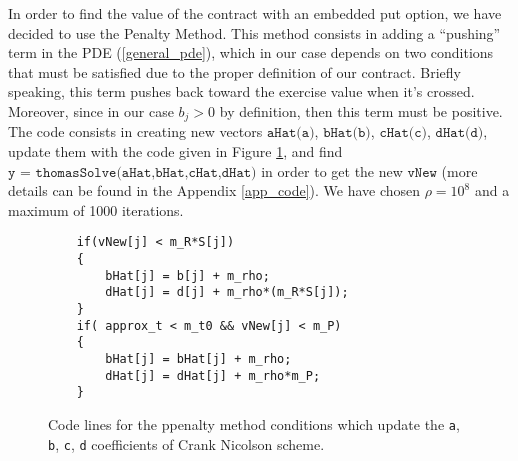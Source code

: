 In order to find the value of the contract with an embedded put option, we have decided to use the Penalty Method. This method consists in adding a ``pushing'' term in the PDE (\ref{general_pde}), which in our case depends on two conditions that must be satisfied due to the proper definition of our contract. Briefly speaking, this term pushes back toward the exercise value when it's crossed. Moreover, since in our case $b_j > 0$ by definition, then this term must be positive. The code consists in creating new vectors $\texttt{aHat(a)}$, $\texttt{bHat(b)}$, $\texttt{cHat(c)}$, $\texttt{dHat(d)}$, update them with the code given in Figure \ref{codePenalty}, and find $\texttt{y = thomasSolve(aHat,bHat,cHat,dHat)}$ in order to get the new $\texttt{vNew}$ (more details can be found in the Appendix \ref{app_code}). We have chosen $\rho=10^{8}$ and a maximum of 1000 iterations.
\vspace{-1.2cm}
\begin{figure}[h!]
\begin{lstlisting}
	if(vNew[j] < m_R*S[j])
	{
		bHat[j] = b[j] + m_rho;
		dHat[j] = d[j] + m_rho*(m_R*S[j]);
	}
	if( approx_t < m_t0 && vNew[j] < m_P)
	{
		bHat[j] = bHat[j] + m_rho;
		dHat[j] = dHat[j] + m_rho*m_P;
	}
\end{lstlisting}
\captionsetup{width=.6\linewidth}
\caption{Code lines for the ppenalty method conditions which update the \texttt{a}, \texttt{b}, \texttt{c}, \texttt{d} coefficients of Crank Nicolson scheme.}\label{codePenalty}
\end{figure}\vspace{-0.22cm}
